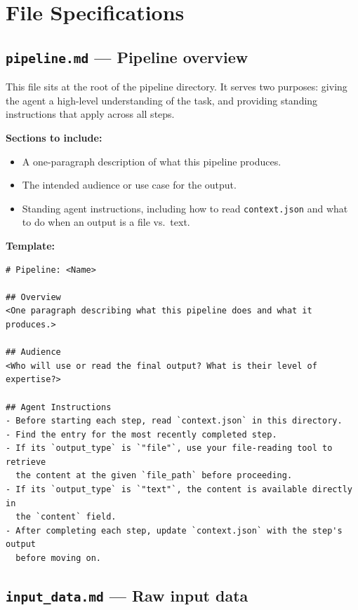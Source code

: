 \documentclass[12pt, a4paper]{article}
\begin{document}
\section{File Specifications}

\subsection{\texttt{pipeline.md} — Pipeline overview}

This file sits at the root of the pipeline directory. It serves two purposes: giving the agent a high-level understanding of the task, and providing standing instructions that apply across all steps.

\textbf{Sections to include:}

\begin{itemize}[leftmargin=1.5em]
  \item A one-paragraph description of what this pipeline produces.
  \item The intended audience or use case for the output.
  \item Standing agent instructions, including how to read \texttt{context.json} and what to do when an output is a file vs.\ text.
\end{itemize}

\textbf{Template:}

\begin{lstlisting}[language={}]
# Pipeline: <Name>

## Overview
<One paragraph describing what this pipeline does and what it produces.>

## Audience
<Who will use or read the final output? What is their level of expertise?>

## Agent Instructions
- Before starting each step, read `context.json` in this directory.
- Find the entry for the most recently completed step.
- If its `output_type` is `"file"`, use your file-reading tool to retrieve
  the content at the given `file_path` before proceeding.
- If its `output_type` is `"text"`, the content is available directly in
  the `content` field.
- After completing each step, update `context.json` with the step's output
  before moving on.
\end{lstlisting}

\subsection{\texttt{input\_data.md} — Raw input data}
\end{document}

